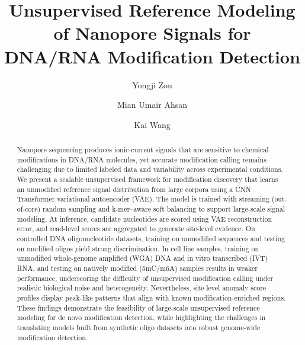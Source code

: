 \documentclass[sigconf, review]{acmart}
\begin{document}
\title{Unsupervised Reference Modeling of Nanopore Signals for DNA/RNA Modification Detection}

\author{Yongji Zou}

\author{Mian Umair Ahsan}

\author{Kai Wang}


\begin{abstract}
Nanopore sequencing produces ionic-current signals that are sensitive to chemical modifications in DNA/RNA molecules, yet accurate modification calling remains challenging due to limited labeled data and variability across experimental conditions. We present a scalable unsupervised framework for modification discovery that learns an unmodified reference signal distribution from large corpora using a CNN–Transformer variational autoencoder (VAE). The model is trained with streaming (out-of-core) random sampling and k-mer–aware soft balancing to support large-scale signal modeling. At inference, candidate nucleotides are scored using VAE reconstruction error, and read-level scores are aggregated to generate site-level evidence. On controlled DNA oligonucleotide datasets, training on unmodified sequences and testing on modified oligos yield strong discrimination. In cell line samples, training on unmodified whole-genome amplified (WGA) DNA and in vitro transcribed (IVT) RNA, and testing on natively modified (5mC/m6A) samples results in weaker performance, underscoring the difficulty of unsupervised modification calling under realistic biological noise and heterogeneity. Nevertheless, site-level anomaly score profiles display peak-like patterns that align with known modification-enriched regions. These findings demonstrate the feasibility of large-scale unsupervised reference modeling for de novo modification detection, while highlighting the challenges in translating models built from synthetic oligo datasets into robust genome-wide modification detection.
\end{abstract}
\end{document}
